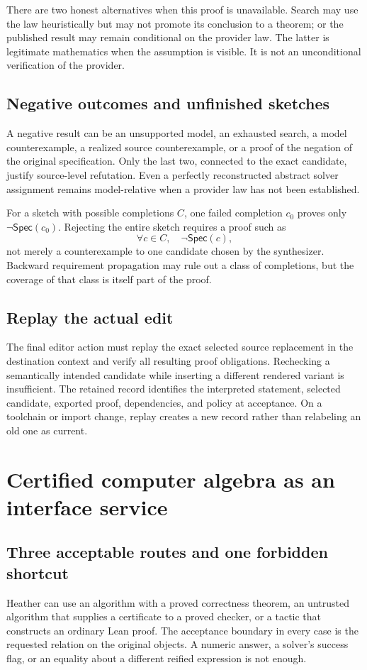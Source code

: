 \documentclass[11pt,letterpaper]{article}
\newcommand{\Spec}{\mathsf{Spec}}\newcommand{\ev}{\mathsf{eval}}
\theoremstyle{definition}\newtheorem{definition}[theorem]{Definition}
\theoremstyle{remark}\newtheorem{remark}[theorem]{Remark}
\begin{document}
There are two honest alternatives when this proof is unavailable. Search may
use the law heuristically but may not promote its conclusion to a theorem; or
the published result may remain conditional on the provider law. The latter
is legitimate mathematics when the assumption is visible. It is not an
unconditional verification of the provider.

\subsection{Negative outcomes and unfinished sketches}
A negative result can be an unsupported model, an exhausted search, a model
counterexample, a realized source counterexample, or a proof of the negation
of the original specification. Only the last two, connected to the exact
candidate, justify source-level refutation. Even a perfectly reconstructed
abstract solver assignment remains model-relative when a provider law has not
been established.

For a sketch with possible completions $C$, one failed completion $c_0$ proves
only $\neg\Spec(c_0)$. Rejecting the entire sketch requires a proof such as
\[
 \forall c\in C,\quad\neg\Spec(c),
\]
not merely a counterexample to one candidate chosen by the synthesizer.
Backward requirement propagation may rule out a class of completions, but the
coverage of that class is itself part of the proof.

\subsection{Replay the actual edit}
The final editor action must replay the exact selected source replacement in
the destination context and verify all resulting proof obligations. Rechecking
a semantically intended candidate while inserting a different rendered variant
is insufficient. The retained record identifies the interpreted statement,
selected candidate, exported proof, dependencies, and policy at acceptance.
On a toolchain or import change, replay creates a new record rather than
relabeling an old one as current.

\section{Certified computer algebra as an interface service}\label{sec:cas}

\subsection{Three acceptable routes and one forbidden shortcut}
Heather can use an algorithm with a proved correctness theorem, an untrusted
algorithm that supplies a certificate to a proved checker, or a tactic that
constructs an ordinary Lean proof. The acceptance boundary in every case is
the requested relation on the original objects. A numeric answer, a solver's
success flag, or an equality about a different reified expression is not enough.
\end{document}
